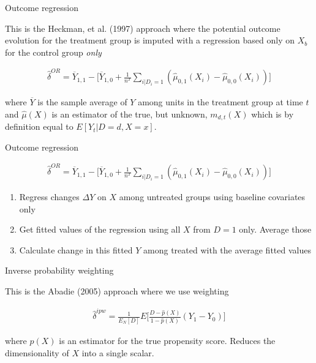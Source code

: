 \documentclass{beamer}
\begin{document}
\begin{frame}{Outcome regression}

This is the Heckman, et al. (1997) approach where the potential outcome evolution for the treatment group is imputed with a regression based only on $X_b$ for the control group \emph{only}

\bigskip

\begin{eqnarray*}
\widehat{\delta}^{OR} = \overline{Y}_{1,1} - \bigg [ \overline{Y}_{1,0} + \frac{1}{n^T} \sum_{i|D_i=1} ( \widehat{\mu}_{0,1}(X_i) - \widehat{\mu}_{0,0}(X_i)) \bigg ]
\end{eqnarray*}

where $\overline{Y}$ is the sample average of $Y$ among units in the treatment group at time $t$ and $\widehat{\mu}(X)$ is an estimator of the true, but unknown, $m_{d,t}(X)$ which is by definition equal to $E[Y_t|D=d,X=x]$.

\end{frame}




\begin{frame}{Outcome regression}

\begin{eqnarray*}
\widehat{\delta}^{OR} = \overline{Y}_{1,1} - \bigg [ \overline{Y}_{1,0} + \frac{1}{n^T} \sum_{i|D_i=1} ( \widehat{\mu}_{0,1}(X_i) - \widehat{\mu}_{0,0}(X_i)) \bigg ]
\end{eqnarray*}

\begin{enumerate}
\item Regress changes $\Delta Y$ on $X$ among untreated groups using baseline covariates only
\item Get fitted values of the regression using all $X$ from $D=1$ only.  Average those
\item Calculate change in this fitted $Y$ among treated with the average fitted values
\end{enumerate}

\end{frame}

\begin{frame}{Inverse probability weighting}

This is the Abadie (2005) approach where we use weighting

\begin{eqnarray*}
\widehat{\delta}^{ipw} = \frac{1}{E_N[D]} E \bigg [ \frac{D-\widehat{p}(X)}{1-\widehat{p}(X)} (Y_1-Y_0) \bigg ]
\end{eqnarray*}

where $\widehat{p}(X)$ is an estimator for the true propensity score. Reduces the dimensionality of $X$ into a single scalar.

\end{frame}
\end{document}
